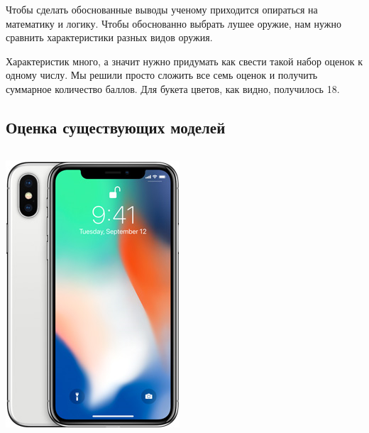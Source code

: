 Чтобы сделать обоснованные выводы ученому приходится опираться на математику и логику. Чтобы обоснованно выбрать лушее оружие, нам нужно сравнить характеристики разных видов оружия. 

Характеристик много, а значит нужно придумать как свести такой набор оценок к одному числу. Мы решили просто сложить все семь оценок и получить суммарное количество баллов. Для букета цветов, как видно, получилось 18.
\par\bigskip

\subsection{Оценка существующих моделей}

\begin{frame}  %
    \begin{columns}
            \begin{center}
                \includegraphics[height=.8\textheight]{fig/iphoneX}
            \end{center}
            

\end{columns}
\end{frame}
